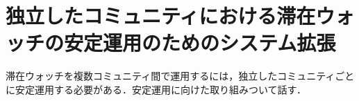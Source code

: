 \section{独立したコミュニティにおける滞在ウォッチの安定運用のためのシステム拡張}
\label{sec:description}
滞在ウォッチを複数コミュニティ間で運用するには，独立したコミュニティごとに安定運用する必要がある．安定運用に向けた取り組みついて話す．

% 

